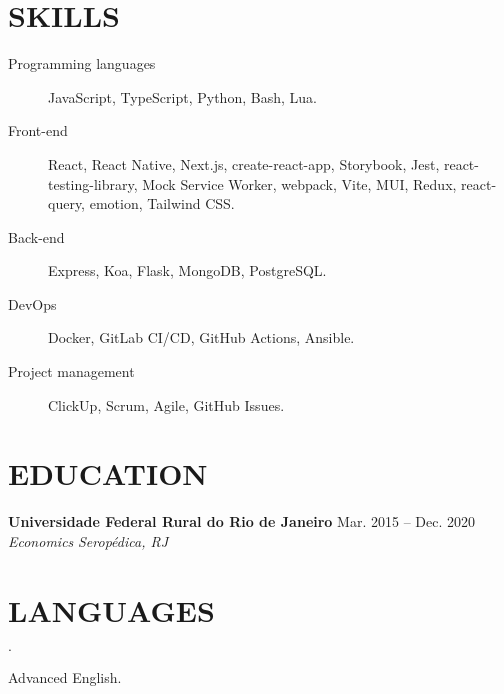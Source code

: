 \documentclass[12pt]{article}
\newenvironment{tightlist}
  {\begin{list}
    {$\cdot$}
    {
      \setlength{\leftmargin}{0em}
      \setlength{\itemsep}{\smallskipamount}
    }
  }
{\end{list}}
\begin{document}
\section*{SKILLS}

\begin{description}
  \item[Programming languages] JavaScript, TypeScript, Python, Bash, Lua.
  \item[Front-end] React, React Native, Next.js, create-react-app, Storybook,
    Jest, react-testing-library, Mock Service Worker, webpack, Vite, MUI, Redux,
    react-query, emotion, Tailwind CSS.
  \item[Back-end] Express, Koa, Flask, MongoDB, PostgreSQL.
  \item[DevOps] Docker, GitLab CI/CD, GitHub Actions, Ansible.
  \item[Project management] ClickUp, Scrum, Agile, GitHub Issues.
\end{description}

\section*{EDUCATION}

\textbf{Universidade Federal Rural do Rio de Janeiro} \hfill {Mar. 2015 -- Dec. 2020} \\
\textit{Economics} \hfill \textit{Seropédica, RJ} {\parfillskip=0pt\par}

\section*{LANGUAGES}

\begin{tightlist}
  \item Advanced English.
\end{tightlist}
\end{document}

